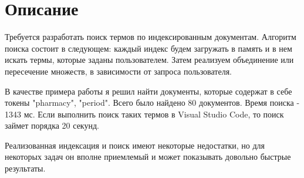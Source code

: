 \section{Описание}
Требуется разработать поиск термов по индексированным документам. Алгоритм поиска состоит в следующем: каждый индекс будем загружать в память и в нем искать термы, которые заданы пользователем. Затем реализуем объединение или пересечение множеств, в зависимости от запроса пользователя.

В качестве примера работы я решил найти документы, которые содержат в себе токены "pharmacy", "period". Всего было найдено 80 документов. Время поиска - 1343 мс. Если выполнить поиск таких термов в Visual Studio Code, то поиск займет порядка 20 секунд.

Реализованная индексация и поиск имеют некоторые недостатки, но для некоторых задач он вполне приемлемый и может показывать довольно быстрые результаты.

\pagebreak

